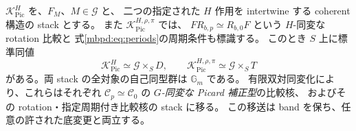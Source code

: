\begin{theorem}
\label{mbpd:thm:coherent-corrections}
$\mathscr K_{\mathrm{Pic}}^H$ を、$F_M$、$M\in\mathscr G$ と、
二つの指定された $H$ 作用を intertwine する coherent 構造の stack とする。
また $\mathscr K_{\mathrm{Pic}}^{H,\rho,\pi}$ では、
$FR_{b,p}\simeq R_{b,0}F$ という $H$-同変な rotation 比較と
式\eqref{mbpd:eq:periods}の周期条件も標識する。
このとき $S$ 上に標準同値
\begin{equation}\label{mbpd:eq:kernel-stacks}
 \mathscr K_{\mathrm{Pic}}^H\simeq\mathscr G\times_SD,
 \qquad
 \mathscr K_{\mathrm{Pic}}^{H,\rho,\pi}\simeq\mathscr G\times_ST
\end{equation}
がある。両 stack の全対象の自己同型群は $\mathbb G_m$ である。
有限双対同変化により、これらはそれぞれ
$\mathcal C_p\simeq\mathcal C_0$ の \emph{$G$-同変な Picard 補正型}の比較核、
およびその rotation・指定周期付き比較核の stack に移る。
この移送は band を保ち、任意の許された底変更と両立する。
\end{theorem}
